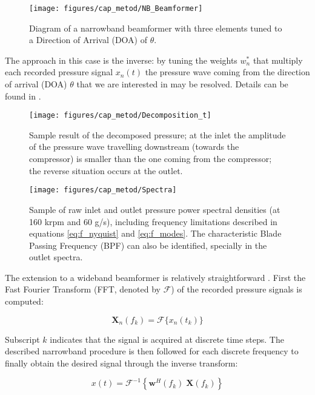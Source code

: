 \begin{figure}[t!]
\centering
\texttt{[image: figures/cap\_metod/NB\_Beamformer]}
\caption[Diagram of a narrowband beamformer]{Diagram of a narrowband beamformer with three elements tuned to a Direction of Arrival (DOA) of $\theta$.}
\label{fig:schematic}
\end{figure}

The approach in this case is the inverse: by tuning the weights $w_n^*$ that multiply each recorded pressure signal $x_n(t)$ the pressure wave coming from the direction of arrival (DOA) $\theta$ that we are interested in may be resolved. Details can be found in \cite{van1988beamforming}.

\begin{figure}[t!]
\centering
\texttt{[image: figures/cap\_metod/Decomposition\_t]}
\caption[Sample result of decomposed pressure]{Sample result of the decomposed pressure; at the inlet the amplitude of the pressure wave travelling downstream (towards the compressor) is smaller than the one coming from the compressor; the reverse situation occurs at the outlet.}
\label{fig:decomposition}
\end{figure}

\begin{figure}[t!]
\texttt{[image: figures/cap\_metod/Spectra]}
\caption[Sample of raw inlet and outlet pressure PSD]{Sample of raw inlet and outlet pressure power spectral densities (at 160 krpm and 60 g/s), including frequency limitations described in equations \ref{eq:f_nyquist} and \ref{eq:f_modes}. The characteristic Blade Passing Frequency (BPF) can also be identified, specially in the outlet spectra.}
\label{fig:spectra}
\end{figure}

The extension to a wideband beamformer is relatively straightforward \cite{piper2011broadband}. First the Fast Fourier Transform (FFT, denoted by $\mathcal F$) of the recorded pressure signals is computed:

\begin{equation}
  \mathbf X_n(f_k)=\mathcal{F}\{x_n(t_k)\}
\end{equation}

Subscript $k$ indicates that the signal is acquired at discrete time steps. The described narrowband procedure is then followed for each discrete frequency to finally obtain the desired signal through the inverse transform:

\begin{equation}
    x(t)=\mathcal{F}^{-1}\left\{\mathbf w^H(f_k)\; \mathbf X(f_k)\right\}
\end{equation}

